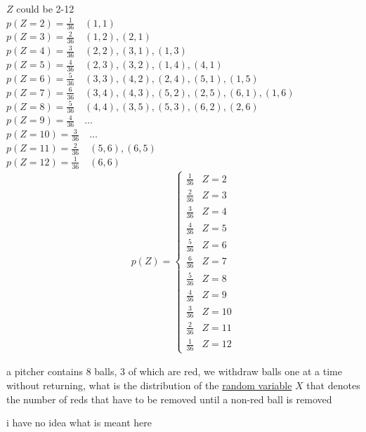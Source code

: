 \documentclass[a4paper,12pt]{article}
\begin{document}
\begin{question}
\begin{answer}
\(Z\) could be 2-12\\
\(p(Z=2)=\frac{1}{36} \quad (1,1)\)\\
\(p(Z=3)=\frac{2}{36} \quad (1,2),(2,1)\)\\
\(p(Z=4)=\frac{3}{36} \quad (2,2),(3,1),(1,3)\)\\
\(p(Z=5)=\frac{4}{36} \quad (2,3),(3,2),(1,4),(4,1)\)\\
\(p(Z=6)=\frac{5}{36} \quad (3,3),(4,2),(2,4),(5,1),(1,5)\)\\
\(p(Z=7)=\frac{6}{36} \quad (3,4),(4,3),(5,2),(2,5),(6,1),(1,6)\)\\
\(p(Z=8)=\frac{5}{36} \quad (4,4),(3,5),(5,3),(6,2),(2,6)\)\\
\(p(Z=9)=\frac{4}{36} \quad \dots\)\\
\(p(Z=10)=\frac{3}{36} \quad \dots\)\\
\(p(Z=11)=\frac{2}{36} \quad (5,6),(6,5)\)\\
\(p(Z=12)=\frac{1}{36} \quad (6,6)\)\\
\begin{gather*}
p(Z) = \begin{cases}
            \frac{1}{36} & Z=2\\
            \frac{2}{36} & Z=3\\
            \frac{3}{36} & Z=4\\
            \frac{4}{36} & Z=5\\
            \frac{5}{36} & Z=6\\
            \frac{6}{36} & Z=7\\
            \frac{5}{36} & Z=8\\
            \frac{4}{36} & Z=9\\
            \frac{3}{36} & Z=10\\
            \frac{2}{36} & Z=11\\
            \frac{1}{36} & Z=12
          \end{cases}
\end{gather*}
\end{answer}
\end{question}
\begin{question}
a pitcher contains 8 balls, 3 of which are red, we withdraw balls one at a time without returning, what is the distribution of the \href{20230104221353-random_variable.org}{random variable} \(X\) that denotes the number of reds that have to be removed until a non-red ball is removed\\
\begin{answer}
i have no idea what is meant here\\
\end{answer}
\end{question}
\end{document}
